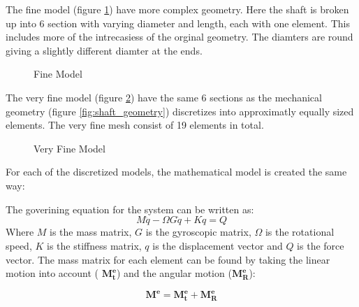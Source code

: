 The fine model (figure \ref{fig:fine_model}) have more complex geometry. Here the shaft is broken up into 6 section with varying diameter and length, each with one element. This includes more of the intrecasiess of the orginal geometry. The diamters are round giving a slightly different diamter at the ends.
\begin{figure}[htbp]
    \centering
    
    \caption{Fine Model}
    \label{fig:fine_model}
\end{figure}

The very fine model (figure \ref{fig:very_fine_model}) have the same 6 sections as the mechanical geometry (figure \ref{fig:shaft_geometry}) discretizes into approximatly equally sized elements. The very fine mesh consist of 19 elements in total.
\begin{figure}[htbp]
    \centering
    
    \caption{Very Fine Model}
    \label{fig:very_fine_model}
\end{figure}

For each of the discretized models, the mathematical model is created the same way:

The goverining equation for the system can be written as:
\begin{equation}
    M \ddot{q} - \Omega G \dot{q} + K q = Q
\end{equation}
Where $M$ is the mass matrix, $G$ is the gyroscopic matrix, $\Omega$ is the rotational speed, $K$ is the stiffness matrix, $q$ is the displacement vector and $Q$ is the force vector. The mass matrix for each element can be found by taking the linear motion into account ( $\mathbf{M_t^e}$) and the angular motion ($\mathbf{M_R^e}$):

\begin{equation}
    \mathbf{M^e} = \mathbf{M_t^e} + \mathbf{M_R^e} 
\end{equation}

